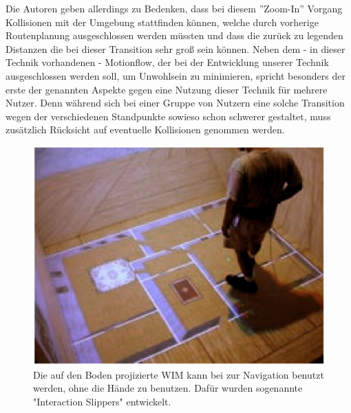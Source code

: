 Die Autoren geben allerdings zu Bedenken, dass bei diesem ”Zoom-In” Vorgang Kollisionen mit der Umgebung stattfinden können, welche durch vorherige Routenplanung ausgeschlossen werden müssten und dass die zurück zu legenden Distanzen die bei dieser Transition sehr groß sein können. 
Neben dem - in dieser Technik vorhandenen - Motionflow, der bei der Entwicklung unserer Technik ausgeschlossen werden soll, um Unwohlsein zu minimieren, spricht besonders der erste der genannten Aspekte gegen eine Nutzung dieser Technik für mehrere Nutzer. Denn während sich bei einer Gruppe von Nutzern eine solche Transition wegen der verschiedenen Standpunkte sowieso schon schwerer gestaltet, muss zusätzlich Rücksicht auf eventuelle Kollisionen genommen werden.

\begin{figure}[h]
  \centering
  \includegraphics[width=\textwidth]{images/step_wim.png}
  \caption{Die auf den Boden projizierte WIM kann bei \cite{LaViola2004Hands-freeEnvironments} zur Navigation benutzt werden, ohne die Hände zu benutzen. Dafür wurden sogenannte "Interaction Slippers" entwickelt.}
  \label{fig:todo}
\end{figure}

